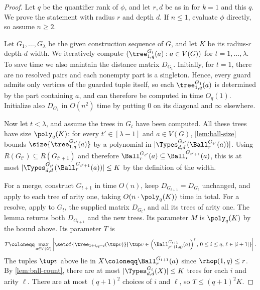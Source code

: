{\renewcommand{\mcdepth}{d}\mcthm*}
\begin{proof}
Let $q$ be the quantifier rank of $\phi$, and let $r,d$ be as in
 for $k=1$ and this $q$.  We prove the statement
with radius $r$ and depth $d$.
If $n\le1$, evaluate $\phi$ directly, so assume $n\ge2$.

Let $G_1,\ldots,G_\lambda$ be the given
construction sequence of $G$, and let $K$ be its radius-$r$ depth-$d$
width.  We iteratively compute $(\tree^{G_t}_{1,q}(a):a\in V(G))$ for $t=1,\ldots,\lambda$. To save time we also maintain the distance matrix $D_{G_t}$.
Initially, for \(t=1\), there are no resolved pairs and each nonempty part is a singleton.
Hence, every guard admits only vertices of the guarded tuple itself, so
each \(\tree^{G_1}_{1,q}(a)\) is determined by the part containing \(a\), and can therefore be computed in time \(O_q(1)\).
Initialize also $D_{G_1}$ in $O(n^2)$ time by putting $0$ on its diagonal and $\infty$ elsewhere.

Now let \(t<\lambda\), and assume the trees in $G_t$ have been computed.
All these trees have size $\poly_{q}(K)$: for every $t'\in[\lambda-1]$
and $a\in V(G)$, \ref{lem:ball-size} bounds
$\size{\tree^{G_{t'}}_{1,q}(a)}$ by a polynomial in
$|\Types^{G_{t'}}_{d,d}(\Ball^{G_{t'}}_{r}(a))|$.  Using $R(G_{t'})\subseteq R(G_{t'+1})$
and therefore $\Ball^{G_{t'}}_r(a)\subseteq \Ball^{G_{t'+1}}_r(a)$, this is at most
$|\Types^{G_{t'}}_{d,d}(\Ball^{G_{t'+1}}_{r}(a))|\le K$ by the definition of
the width.

For a merge, construct $G_{t+1}$ in time $O(n)$, keep $D_{G_{t+1}}=D_{G_t}$ unchanged, and apply  to each tree of arity one, taking $O(n\cdot\poly_q(K))$ time in total.
For a resolve, apply  to $G_t$, the supplied matrix $D_{G_t}$, and all its trees of arity one. The lemma returns both $D_{G_{t+1}}$ and the new trees.
Its parameter $M$ is $\poly_q(K)$ by the bound above.
Its parameter $T$ is
$$T\coloneqq \max_{a\in V(G)}\left|\setof{\tree_{1+i,q-i}(\tup v)}{\tup v\in \left(\Ball^{G_{t+1}}_{\rho^+(1,q)}(a)\right)^\ell,\,  0\le i\le q,\, \ell\in [i+1]}\right|.$$
The tuples $\tup v$ above lie in $X\coloneqq\Ball^{G_{t+1}}_r(a)$ since $\rhop(1,q)\le r$.
By \ref{lem:ball-count}, there are at most $|\Types^{G_t}_{d,d}(X)|\le K$ trees for each $i$ and arity $\ell$.
There are at most $(q+1)^2$ choices of $i$ and $\ell$, so $T\le(q+1)^2K$.


\end{proof}
